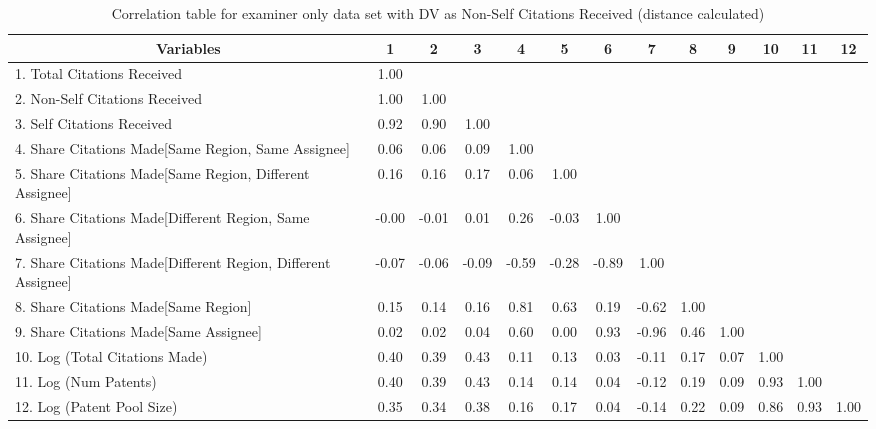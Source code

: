 \begin{table}[htbp]\centering \caption{Correlation table for examiner only data set with DV as Non-Self Citations Received (distance calculated)\label{e.ncorrelation}}
\scriptsize
\singlespacing
\begin{tabular}{l  c  c  c  c  c  c  c  c  c  c  c  c }\hline\hline
\multicolumn{1}{c}{Variables} &1&2&3&4&5&6&7&8&9&10&11&12\\ \hline
1. Total Citations Received&1.00\\
2. Non-Self Citations Received&1.00&1.00\\
3. Self Citations Received&0.92&0.90&1.00\\
4. Share Citations Made[Same Region, Same Assignee]&0.06&0.06&0.09&1.00\\
5. Share Citations Made[Same Region, Different Assignee]&0.16&0.16&0.17&0.06&1.00\\
6. Share Citations Made[Different Region, Same Assignee]&-0.00&-0.01&0.01&0.26&-0.03&1.00\\
7. Share Citations Made[Different Region, Different Assignee]&-0.07&-0.06&-0.09&-0.59&-0.28&-0.89&1.00\\
8. Share Citations Made[Same Region]&0.15&0.14&0.16&0.81&0.63&0.19&-0.62&1.00\\
9. Share Citations Made[Same Assignee]&0.02&0.02&0.04&0.60&0.00&0.93&-0.96&0.46&1.00\\
10. Log (Total Citations Made)&0.40&0.39&0.43&0.11&0.13&0.03&-0.11&0.17&0.07&1.00\\
11. Log (Num Patents)&0.40&0.39&0.43&0.14&0.14&0.04&-0.12&0.19&0.09&0.93&1.00\\
12. Log (Patent Pool Size)&0.35&0.34&0.38&0.16&0.17&0.04&-0.14&0.22&0.09&0.86&0.93&1.00\\
\hline \hline 
 \end{tabular}
\end{table}
